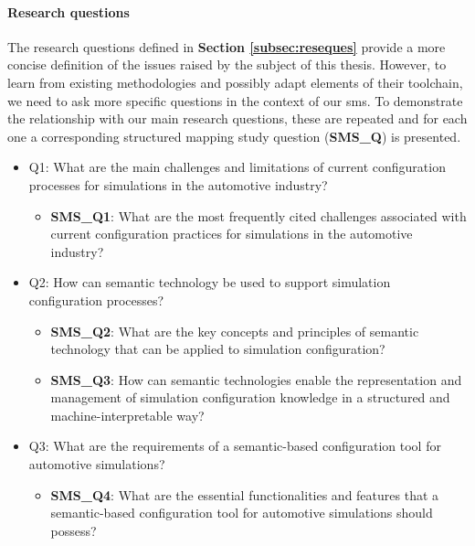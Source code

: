            \paragraph{Research questions\label{para:res-ques}}
            The research questions defined in \textbf{Section \ref{subsec:reseques}} provide a more concise definition of the issues raised by the subject of this thesis. However, to learn from existing methodologies and possibly adapt elements of their toolchain, we need to ask more specific questions in the context of our \acrshort{sms}. To demonstrate the relationship with our main research questions, these are repeated and for each one a corresponding structured mapping study question (\textbf{SMS\_Q}) is presented.

            \begin{itemize}
                \item Q1: What are the main challenges and limitations of current configuration processes for simulations in the automotive industry?
                    \begin{itemize}
                        \item \textbf{SMS\_Q1}: What are the most frequently cited challenges associated with current configuration practices for simulations in the automotive industry?
                    \end{itemize}


                \item Q2: How can semantic technology be used to support simulation configuration processes?
                    \begin{itemize}
                        \item \textbf{SMS\_Q2}: What are the key concepts and principles of semantic technology that can be applied to simulation configuration?

                        \item \textbf{SMS\_Q3}: How can semantic technologies enable the representation and management of simulation configuration knowledge in a structured and machine-interpretable way?
                    \end{itemize}
                    
                \item Q3: What are the requirements of a semantic-based configuration tool for automotive simulations?
                    \begin{itemize}
                        \item \textbf{SMS\_Q4}: What are the essential functionalities and features that a semantic-based configuration tool for automotive simulations should possess?
                    \end{itemize}



\end{itemize}
